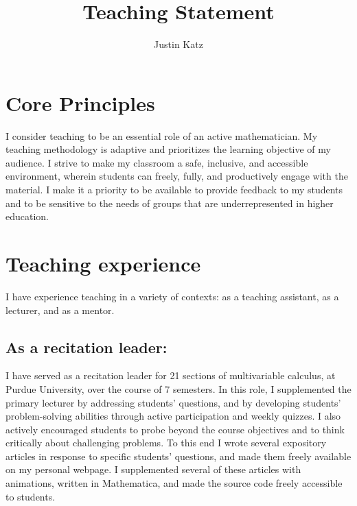 \documentclass[12pt]{article}
\title{Teaching Statement}
\author{Justin Katz}
\date{}
\begin{document}
 
	\maketitle
\begin{comment}
	In an application for a postdoctoral position, the
	teaching statement is not very important, so don’t waste much time on it. My
	opinion is that the teaching statement cannot help your application much or at all,
	but it might hurt your application if you write something really weird. (“When it
	comes to teaching, I believe it is better to be feared than to be loved.”) No one really
	cares what is your teaching philosophy. Just write a few conventional statements
	about what makes a good teacher (e.g. encouraging interaction with the students),
	and if you have received good eaching evaluations, then this is an opportunity to
	brag about them.
\end{comment}
\section*{Core Principles}
I consider teaching to be an essential role of an active mathematician.  My teaching methodology is adaptive and prioritizes the learning objective of my audience.  I strive to make my classroom a safe, inclusive, and accessible environment, wherein students can freely, fully, and productively engage with the material. I make it a priority to be available to provide feedback to my students and to be sensitive to the needs of groups that are underrepresented in higher education. 
\section*{Teaching experience}
I have experience teaching in a variety of contexts: as a teaching assistant, as a lecturer, and as a mentor.
\subsection*{As a recitation leader:} I have served as a recitation leader for 21 sections of multivariable calculus, at Purdue University, over the course of 7 semesters. In this role, I supplemented the primary lecturer by addressing students' questions, and by developing students' problem-solving abilities through active participation and weekly quizzes.  I also actively encouraged students to probe beyond the course objectives and to think critically about challenging problems.  To this end I wrote several expository articles in response to specific students' questions, and made them freely available on my personal webpage. I supplemented several of these articles with animations, written in Mathematica, and made the source code freely accessible to students. 
\end{document}
